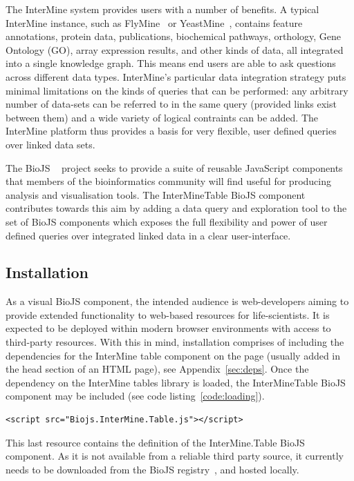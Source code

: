 \documentclass[10pt,a4paper,twocolumn]{article}
\begin{document}
The InterMine system provides users with a number of benefits. A typical
InterMine instance, such as FlyMine~\cite{flymine} or
YeastMine~\cite{yeastmine}, contains feature annotations, protein data,
publications, biochemical pathways, orthology, Gene Ontology (GO), array
expression results, and other kinds of data, all integrated into a single
knowledge graph. This means end users are able to ask questions across different
data types. InterMine's particular data integration strategy puts minimal
limitations on the kinds of queries that can be performed: any arbitrary number
of data-sets can be referred to in the same query (provided links exist between
them) and a wide variety of logical contraints can be added. The InterMine
platform thus provides a basis for very flexible, user defined
queries over linked data sets. 

The BioJS ~\cite{biojs} project seeks to provide a suite of reusable JavaScript
components that members of the bioinformatics community will find useful for
producing analysis and visualisation tools. The InterMineTable BioJS component
contributes towards this aim by adding a data query and exploration tool to the
set of BioJS components which exposes the full flexibility and power of user
defined queries over integrated linked data in a clear user-interface.

\subsection*{Installation}

As a visual BioJS component, the intended audience is web-developers aiming to
provide extended functionality to web-based resources for life-scientists. It is
expected to be deployed within modern browser environments with access to
third-party resources. With this in mind, installation comprises of including
the dependencies for the InterMine table component on the page (usually added in
the head section of an HTML page), see Appendix~\ref{sec:deps}. Once the
dependency on the InterMine tables library is loaded, the InterMineTable BioJS
component may be included (see code listing~\ref{code:loading}).

\begin{lstlisting}[caption={Loading the BioJS InterMine Table library}, label={code:loading}]
<script src="Biojs.InterMine.Table.js"></script>
\end{lstlisting}

This last resource contains the definition of the InterMine.Table BioJS
component. As it is not available from a reliable third party source, it
currently needs to be downloaded from the BioJS
registry~\cite{site:biojs-registry}, and hosted locally.
\end{document}
